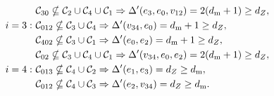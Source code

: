 \documentclass[
 prx,
 reprint,
 superscriptaddress,
 longbibliography,
 dvipsnames
]{revtex4-2}
\begin{document}
\begin{widetext}
\begin{subequations}
\begin{align}
    &\condsete{30} \nsubseteq \condsete{2} \cup \condsete{4} \cup \condsete{1} \Rightarrow \distprime{e_3, e_0, v_{12}} = 2(\dm + 1) \geq \dz, \label{eq:dist_layout_req_i2_30} \\ 
    i=3:~ &\condsete{012} \nsubseteq \condsete{3} \cup \condsete{4} \Rightarrow \distprime{v_{34}, e_0} = \dm + 1 \geq \dz, \label{eq:dist_layout_req_i3_012} \\
    &\condsete{402} \nsubseteq \condsete{3} \cup \condsete{1} \Rightarrow \distprime{e_0, e_2} = \dm + 1 \geq \dz, \label{eq:dist_layout_req_i3_402} \\
    &\condsete{02} \nsubseteq \condsete{3} \cup \condsete{4} \cup \condsete{1} \Rightarrow \distprime{v_{34}, e_0, e_2} = 2(\dm + 1) \geq \dz, \label{eq:dist_layout_req_i3_02} \\ 
    i=4:~ &\condsete{013} \nsubseteq \condsete{4} \cup \condsete{2} \Rightarrow \distprime{e_1, e_3} = \dz \geq \dm, \label{eq:dist_layout_req_i4_013} \\ 
    &\condsete{012} \nsubseteq \condsete{4} \cup \condsete{3} \Rightarrow \distprime{e_2, v_{34}} = \dz \geq \dm. \label{eq:dist_layout_req_i4_012}

\end{align}
\end{subequations}
\end{widetext}
\end{document}
